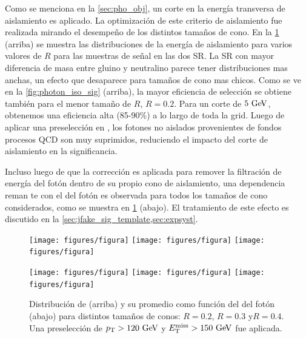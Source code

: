 Como se menciona en la \cref{sec:pho_obj}, un corte en la energía transversa
de aislamiento es aplicado.
La optimización de este criterio de aislamiento  fue realizada mirando el desempe\~no
de los distintos tamaños de cono. En la \cref{fig:photon_iso} (arriba)
se muestra las distribuciones de la energía de aislamiento para varios valores de $R$ para
las muestras de señal en las dos SR. La SR con mayor diferencia de masa entre
gluino y neutralino parece tener distribuciones mas anchas, un efecto que desaparece
para tamaños de cono mas chicos. Como se ve en la \cref{fig:photon_iso_sig} (arriba),
la mayor eficiencia de selección se obtiene también para el menor tamaño de $R$, $R = 0.2$.
Para un corte de $5 \GeV$, obtenemos una eficiencia alta (85-90\%) a lo largo de toda la grid.
Luego de aplicar una preselección en {\met}, los fotones no aislados provenientes de fondos
procesos QCD son muy suprimidos, reduciendo el impacto del corte de aislamiento en la
significancia.

Incluso luego de que la corrección es aplicada para remover la filtración
de energía del fotón dentro de su propio cono de aislamiento, una dependencia
reman te con el {\pt} del fotón es observada para todos los tamaños de cono
considerados, como se muestra en \cref{fig:photon_iso} (abajo).
El tratamiento de este efecto es discutido en la \cref{sec:jfake_sig_template,sec:expsyst}.


\begin{figure}[th!]
 \centering
 \texttt{[image: figures/figura]} %
 \texttt{[image: figures/figura]} %
 \texttt{[image: figures/figura]} %

 \texttt{[image: figures/figura]} %
 \texttt{[image: figures/figura]} %
 \texttt{[image: figures/figura]} %

 \caption{Distribución de {\etiso} (arriba) y su promedio como función del
   {\pt} del fotón (abajo) para distintos tamaños de conos: $R=0.2$, $R=0.3$ y$R=0.4$.
   Una preselección de $\pt>120\gev$ y $\met>150\gev$ fue aplicada.}
 \label{fig:photon_iso}
\end{figure}

